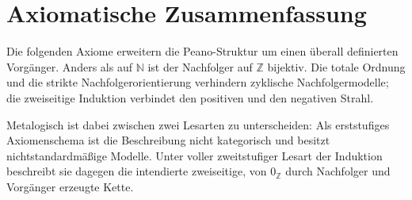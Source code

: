 \documentclass[main.tex]{subfiles}
\begin{document}
\section{Axiomatische Zusammenfassung}

Die folgenden Axiome erweitern die Peano-Struktur um einen überall
definierten Vorgänger. Anders als auf \(\mathbb N\) ist der Nachfolger auf
\(\mathbb Z\) bijektiv. Die totale Ordnung und die strikte
Nachfolgerorientierung verhindern zyklische Nachfolgermodelle; die
zweiseitige Induktion verbindet den positiven und den negativen Strahl.

Metalogisch ist dabei zwischen zwei Lesarten zu unterscheiden: Als
erststufiges Axiomenschema ist die Beschreibung nicht kategorisch und
besitzt nichtstandardmäßige Modelle. Unter voller zweitstufiger Lesart der
Induktion beschreibt sie dagegen die intendierte zweiseitige, von
\(0_{\mathbb Z}\) durch Nachfolger und Vorgänger erzeugte Kette.

\end{document}

